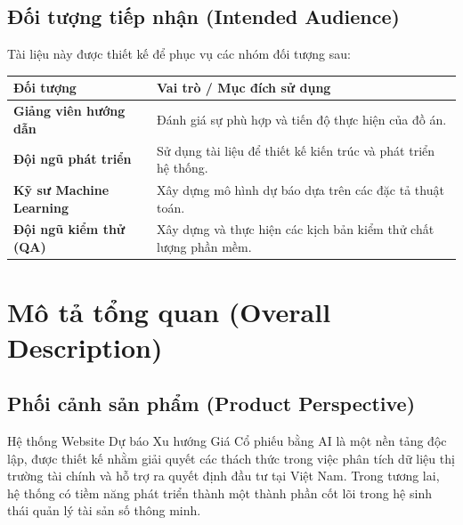 \documentclass[12pt, a4paper]{article}
\begin{document}
\subsection{Đối tượng tiếp nhận (Intended Audience)}
Tài liệu này được thiết kế để phục vụ các nhóm đối tượng sau:
\begin{table}[htbp]
    \centering
    \renewcommand{\arraystretch}{1.3}
    \small
    \begin{tabularx}{\textwidth}{|l|X|}
        \hline
        \rowcolor{gray!20}
        \textbf{Đối tượng} & \textbf{Vai trò / Mục đích sử dụng}                              \\
        \hline

        \textbf{Giảng viên hướng dẫn}
                           & Đánh giá sự phù hợp và tiến độ thực hiện của đồ án.              \\
        \hline

        \textbf{Đội ngũ phát triển}
                           & Sử dụng tài liệu để thiết kế kiến trúc và phát triển hệ thống.   \\
        \hline

        \textbf{Kỹ sư Machine Learning}
                           & Xây dựng mô hình dự báo dựa trên các đặc tả thuật toán.          \\
        \hline

        \textbf{Đội ngũ kiểm thử (QA)}
                           & Xây dựng và thực hiện các kịch bản kiểm thử chất lượng phần mềm. \\
        \hline
    \end{tabularx}
\end{table}

\section{Mô tả tổng quan (Overall Description)}

\subsection{Phối cảnh sản phẩm (Product Perspective)}

Hệ thống Website Dự báo Xu hướng Giá Cổ phiếu bằng AI là một nền tảng độc lập, được thiết kế nhằm giải quyết các thách thức trong việc phân tích dữ liệu thị trường tài chính và hỗ trợ ra quyết định đầu tư tại Việt Nam. Trong tương lai, hệ thống có tiềm năng phát triển thành một thành phần cốt lõi trong hệ sinh thái quản lý tài sản số thông minh.
\end{document}
